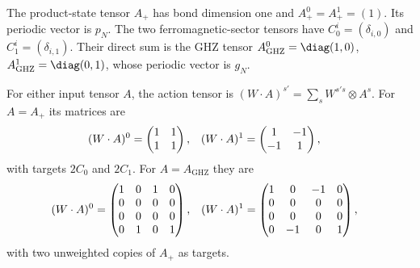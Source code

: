 \begin{definition}
    \label{def:asymex_kw_action}
    \leanok
    The product-state tensor $A_+$ has bond dimension one and
    $A_+^0=A_+^1=(1)$. Its periodic vector is $p_N$.
    The two ferromagnetic-sector tensors have
    $C_0^i=(\delta_{i,0})$ and $C_1^i=(\delta_{i,1})$.
    Their direct sum is the GHZ tensor
    $A_{\mathrm{GHZ}}^0=\diag(1,0)$,
    $A_{\mathrm{GHZ}}^1=\diag(0,1)$, whose periodic vector is $g_N$.

    For either input tensor $A$, the action tensor is
    $(W\cdot A)^{s'}=\sum_sW^{s's}\otimes A^s$.
    For $A=A_+$ its matrices are
    \begin{align}
        (W\cdot A)^0
         & =\begin{pmatrix}1&1\\1&1\end{pmatrix},
         &
        (W\cdot A)^1
         & =\begin{pmatrix}1&-1\\-1&1\end{pmatrix},
        \notag
    \end{align}
    with targets $2C_0$ and $2C_1$. For $A=A_{\mathrm{GHZ}}$ they are
    \begin{align}
        (W\cdot A)^0
         & =\begin{pmatrix}
                1 & 0 & 1 & 0 \\
                0 & 0 & 0 & 0 \\
                0 & 0 & 0 & 0 \\
                0 & 1 & 0 & 1
            \end{pmatrix},
         &
        (W\cdot A)^1
         & =\begin{pmatrix}
                1 & 0  & -1 & 0 \\
                0 & 0  & 0  & 0 \\
                0 & 0  & 0  & 0 \\
                0 & -1 & 0  & 1
            \end{pmatrix},
        \notag
    \end{align}
    with two unweighted copies of $A_+$ as targets.
\end{definition}

